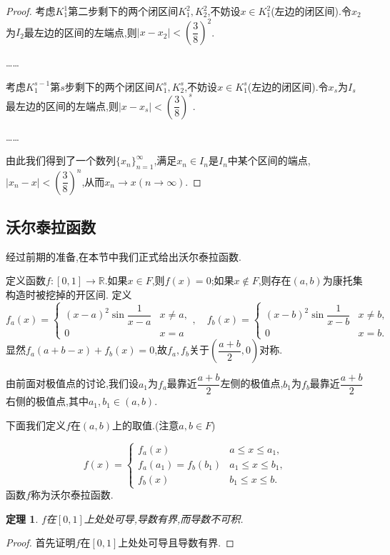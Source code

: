 \documentclass[a4paper,12pt]{article}
\newtheorem{theorem}{定理}[section]
\begin{document}
{\begin{proof}
                考虑$K_1^1$第二步剩下的两个闭区间$K_1^2,K_2^2$,不妨设$x\in K_1^2$(左边的闭区间).令$x_2$为$I_2$最左边的区间的左端点,则$|x-x_2|<\left(\dfrac{3}{8}\right)^2$.

                \dots\dots

                考虑$K_1^{s-1}$第$s$步剩下的两个闭区间$K_1^s,K_2^s$,不妨设$x\in K_1^s$(左边的闭区间).令$x_s$为$I_s$最左边的区间的左端点,则$|x-x_s|<\left(\dfrac{3}{8}\right)^s$.

                \dots\dots

                由此我们得到了一个数列$\{x_n\}_{n=1}^\infty$,满足$x_n\in I_n$是$I_n$中某个区间的端点,$|x_n-x|<\left(\dfrac{3}{8}\right)^n$,从而$x_n\to x(n\to\infty)$.
            \end{proof}

        \subsection{沃尔泰拉函数}
            经过前期的准备,在本节中我们正式给出沃尔泰拉函数.
            
            定义函数$f:[0,1]\to\mathbb{R}$.如果$x\in F$,则$f(x)=0$;如果$x\not\in F$,则存在$(a,b)$为康托集构造时被挖掉的开区间.
            定义$$f_a(x)=\begin{cases}
                (x-a)^2\sin\dfrac{1}{x-a} &x\not=a,\\
                0 &x=a
            \end{cases},\quad f_b(x)=\begin{cases}
                (x-b)^2\sin\dfrac{1}{x-b} &x\not=b,\\
                0 &x=b.
            \end{cases}$$
            显然$f_a(a+b-x)+f_b(x)=0$,故$f_a,f_b$关于$\left(\dfrac{a+b}{2},0\right)$对称.

            由前面对极值点的讨论,我们设$a_1$为$f_a$最靠近$\dfrac{a+b}{2}$左侧的极值点,$b_1$为$f_b$最靠近$\dfrac{a+b}{2}$右侧的极值点,其中$a_1,b_1\in(a,b)$.

            下面我们定义$f$在$(a,b)$上的取值.(注意$a,b\in F$)

            $$f(x)=\begin{cases}
                f_a(x)& a\leqslant x\leqslant a_1,\\
                f_a(a_1)=f_b(b_1) & a_1\leqslant x\leqslant b_1,\\
                f_b(x) & b_1\leqslant x\leqslant b.
            \end{cases}$$
            函数$f$称为沃尔泰拉函数.
            \begin{theorem}
                $f$在$[0,1]$上处处可导,导数有界,而导数不可积.
            \end{theorem}
            \begin{proof}
                首先证明$f$在$[0,1]$上处处可导且导数有界.


\end{proof}}
\end{document}
